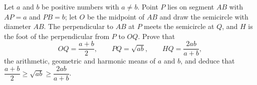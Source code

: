 Let $a$ and $b$ be positive numbers with $a\ne b$. Point $P$ lies on segment $AB$ with $AP=a$ and $PB=b$; let $O$ be the midpoint of $AB$ and draw the semicircle with diameter $AB$. The perpendicular to $AB$ at $P$ meets the semicircle at $Q$, and $H$ is the foot of the perpendicular from $P$ to $OQ$. Prove that
\[
OQ=\dfrac{a+b}{2},\qquad PQ=\sqrt{ab},\qquad HQ=\dfrac{2ab}{a+b},
\]
the arithmetic, geometric and harmonic means of $a$ and $b$, and deduce that $\dfrac{a+b}{2}\ge\sqrt{ab}\ge\dfrac{2ab}{a+b}$.
